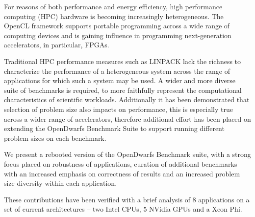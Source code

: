 \documentclass[../document.tex]{subfiles}
\begin{document}
For reasons of both performance and energy efficiency, high performance computing (HPC) hardware is becoming increasingly heterogeneous.
The OpenCL framework supports portable programming across a wide range of computing devices and is gaining influence in programming next-generation accelerators, in particular, FPGAs.

Traditional HPC performance measures such as LINPACK lack the richness to characterize the performance of a heterogeneous system across the range of applications for which such a system may be used.
A wider and more diverse suite of benchmarks is required, to more faithfully  represent the computational characteristics of scientific workloads.
Additionally it has been demonstrated that selection of problem size also impacts on performance, this is especially true across a wider range of accelerators, therefore additional effort has been placed on extending the OpenDwarfs Benchmark Suite to support running different problem sizes on each benchmark.

We present a rebooted version of the OpenDwarfs Benchmark suite, with a strong focus placed on robustness of applications, curation of additional benchmarks with an increased emphasis on correctness of results and an increased problem size diversity within each application.

These contributions have been verified with a brief analysis of 8 applications on a set of current architectures -- two Intel CPUs, 5 NVidia GPUs and a Xeon Phi.



\end{document}

